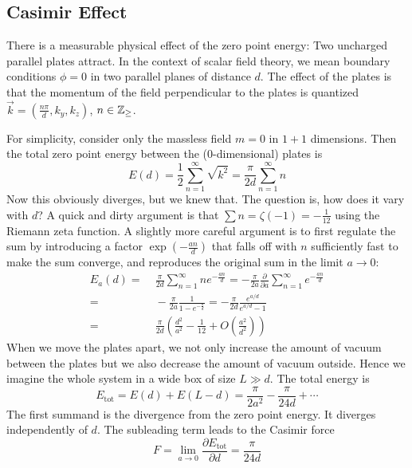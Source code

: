 \documentclass[12pt]{article}
\begin{document}
\subsection{Casimir Effect}

There is a measurable physical effect of the zero point energy: Two
uncharged parallel plates attract. In the context of scalar field
theory, we mean boundary conditions $\phi=0$ in two parallel planes of
distance $d$. The effect of the plates is that the momentum of the
field perpendicular to the plates is quantized $\vec{k} =
(\frac{n\pi}{d}, k_y, k_z)$, $n\in \mathbb{Z}_{\geq}$. 

For simplicity, consider only the massless field $m=0$ in $1+1$
dimensions. Then the total zero point energy between the
(0-dimensional) plates is
\begin{equation}
  E(d) = \frac{1}{2} \sum_{n=1}^\infty \sqrt{k^2} = 
  \frac{\pi}{2d} \sum _{n=1}^\infty n
\end{equation}
Now this obviously diverges, but we knew that. The question is, how
does it vary with $d$? A quick and dirty argument is that $\sum n =
\zeta(-1) = -\frac{1}{12}$ using the Riemann zeta function. A slightly
more careful argument is to first regulate the sum by introducing a
factor $\exp(-\frac{an}{d})$ that falls off with $n$ sufficiently fast to make
the sum converge, and reproduces the original sum in the limit $a\to
0$:
\begin{equation}
  \begin{split}
    E_a(d) =&\;
    \frac{\pi}{2d} \sum_{n=1}^\infty n e^{-\frac{an}{d}} = 
    - \frac{\pi}{2a} \frac{\partial}{\partial a} 
    \sum_{n=1}^\infty e^{-\frac{an}{d}} 
    \\ =&\;
    - \frac{\pi}{2a} 
    \frac{1}{1- e^{-\frac{a}{d}}} =   
    -\frac{\pi}{2d} \frac{e^{a/d}}{e^{a/d}-1} 
    \\ =&\;
    \frac{\pi}{2d} 
    \left(
      \frac{d^2}{a^2} - \frac{1}{12} + O(\tfrac{a^2}{d^2}) 
    \right)    
  \end{split}
\end{equation}
When we move the plates apart, we not only increase the amount of
vacuum between the plates but we also decrease the amount of vacuum
outside. Hence we imagine the whole system in a wide box of size $L\gg
d$. The total energy is 
\begin{equation}
  E_\text{tot} = E(d) + E(L-d) = 
  \frac{\pi}{2a^2} - \frac{\pi}{24 d} + \cdots
\end{equation}
The first summand is the divergence from the zero point energy. It
diverges independently of $d$. The subleading term leads to the
Casimir force
\begin{equation}
  F = \lim_{a\to 0} \frac{\partial E_\text{tot}}{\partial d} 
  = \frac{\pi}{24 d}
\end{equation}
\end{document}
